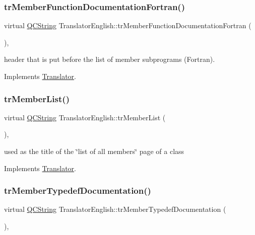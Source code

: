 \subsubsection{\texorpdfstring{trMemberFunctionDocumentationFortran()}{trMemberFunctionDocumentationFortran()}}
{\footnotesize\ttfamily virtual \mbox{\hyperlink{class_q_c_string}{Q\+C\+String}} Translator\+English\+::tr\+Member\+Function\+Documentation\+Fortran (\begin{DoxyParamCaption}{ }\end{DoxyParamCaption})\hspace{0.3cm}{\ttfamily [inline]}, {\ttfamily [virtual]}}

header that is put before the list of member subprograms (Fortran). 

Implements \mbox{\hyperlink{class_translator}{Translator}}.

\mbox{\label{class_translator_english_a32f5c913bcc327cd7df3c337b1cdf076}} 
\subsubsection{\texorpdfstring{trMemberList()}{trMemberList()}}
{\footnotesize\ttfamily virtual \mbox{\hyperlink{class_q_c_string}{Q\+C\+String}} Translator\+English\+::tr\+Member\+List (\begin{DoxyParamCaption}{ }\end{DoxyParamCaption})\hspace{0.3cm}{\ttfamily [inline]}, {\ttfamily [virtual]}}

used as the title of the \char`\"{}list of all members\char`\"{} page of a class 

Implements \mbox{\hyperlink{class_translator}{Translator}}.

\mbox{\label{class_translator_english_ae2783683c8a9668ad4a225dbf1ba9762}} 
\subsubsection{\texorpdfstring{trMemberTypedefDocumentation()}{trMemberTypedefDocumentation()}}
{\footnotesize\ttfamily virtual \mbox{\hyperlink{class_q_c_string}{Q\+C\+String}} Translator\+English\+::tr\+Member\+Typedef\+Documentation (\begin{DoxyParamCaption}{ }\end{DoxyParamCaption})\hspace{0.3cm}{\ttfamily [inline]}, {\ttfamily [virtual]}}

